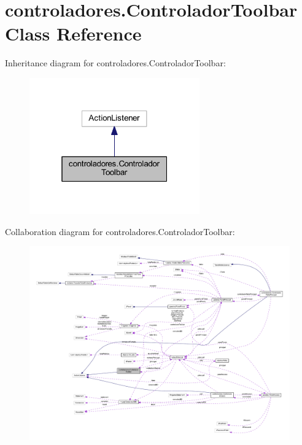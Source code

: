 \hypertarget{classcontroladores_1_1_controlador_toolbar}{}\section{controladores.\+Controlador\+Toolbar Class Reference}
\label{classcontroladores_1_1_controlador_toolbar}


Inheritance diagram for controladores.\+Controlador\+Toolbar\+:
\nopagebreak
\begin{figure}[H]
\begin{center}
\leavevmode
\includegraphics[width=208pt]{classcontroladores_1_1_controlador_toolbar__inherit__graph}
\end{center}
\end{figure}


Collaboration diagram for controladores.\+Controlador\+Toolbar\+:
\nopagebreak
\begin{figure}[H]
\begin{center}
\leavevmode
\includegraphics[width=350pt]{classcontroladores_1_1_controlador_toolbar__coll__graph}
\end{center}
\end{figure}
